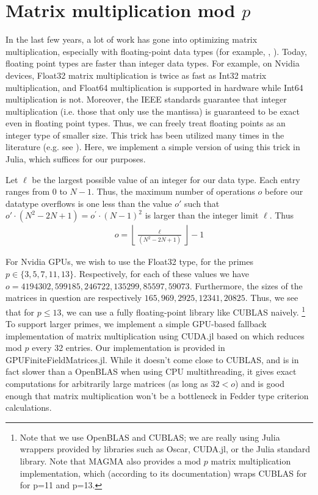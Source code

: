 \documentclass[a4paper]{article}
\theoremstyle{definition}
\theoremstyle{remark}
\begin{document}
\section{Matrix multiplication mod \(p\)}

In the last few years, a lot of work has gone into optimizing matrix multiplication,
especially with floating-point data types
(for example, \cite{nvidia-2024-cublas}, \cite{openblas-2024-openblas}). 
Today, floating point types are faster than
integer data types.
For example, on Nvidia devices, Float32 matrix multiplication
is twice as fast as Int32 matrix multiplication, and Float64
multiplication is supported in hardware while Int64 multiplication
is not.
Moreover, the IEEE standards guarantee that integer multiplication (i.e. those that only use the mantissa) 
is guaranteed to be exact even in floating point types. 
Thus, we can freely treat floating points as an integer type of smaller size.
This trick has been utilized many times in the literature (e.g. see \cite{bglm-2024-matmul-modp}).
Here, we implement a simple version of using this trick in Julia,
which suffices for our purposes.

Let \(\ell\) be the largest possible value of an integer for our data type.
Each entry ranges from \(0\) to \(N-1\).
Thus, the maximum number of operations $o$ before our datatype overflows is one less than the value $o'$ such that 
$o' \cdot (N^2 - 2N + 1) = o^{\prime} \cdot (N-1)^{2} $ is larger than the integer limit $\ell$. Thus
\begin{align*}
    o = \left\lfloor \frac{\ell}{(N^2 - 2N + 1)} \right\rfloor - 1
\end{align*}

For Nvidia GPUs, we wish to use the Float32 type, for the primes
\(p \in \{3,5,7,11,13\}\).
Respectively, for each of these values we have
\(o = 4194302, 599185, 246722, 135299, 85597, 59073\).
Furthermore, the sizes of the matrices in question are 
respectively
 \(165, 969, 2925, 12341, 20825\).
Thus, we see that for \(p \leq 13\), we can use a fully floating-point
library like CUBLAS naively.
\footnote{
    Note that we use OpenBLAS and CUBLAS; 
    we are really using Julia wrappers
    provided by libraries such as Oscar, 
    CUDA.jl, or the Julia standard library.
    Note that MAGMA also provides
    a mod $p$ matrix multiplication implementation,
    which (according to its documentation) wraps CUBLAS for 
    for p=11 and
    p=13. 
}
To support larger primes, we implement a 
simple GPU-based fallback implementation of matrix multiplication using CUDA.jl
based on \cite{mao-2024-matmul}
which reduces mod \(p\) every 32 entries.
Our implementation is provided in GPUFiniteFieldMatrices.jl.
While it doesn't come close to CUBLAS, and is in fact slower
than a OpenBLAS when using CPU multithreading, it gives exact
computations for arbitrarily large
matrices (as long as \(32 < o\))
and is good enough that
matrix multiplication won't be a bottleneck in 
Fedder type criterion calculations.
\end{document}
